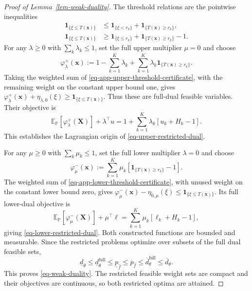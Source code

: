 \begin{proof}[Proof of Lemma~\ref{lem-weak-duality}]
  The threshold relations are the pointwise inequalities
  \begin{align}
    \mathbf1_{\{\xi\le T(\bm x)\}}
    &\le\mathbf1_{\{\xi<r_k\}}+\mathbf1_{\{T(\bm x)\ge r_k\}},
    \label{eq-app-upper-threshold-certificate}\\
    \mathbf1_{\{\xi\le T(\bm x)\}}
    &\ge\mathbf1_{\{\xi\le r_k\}}+\mathbf1_{\{T(\bm x)\ge r_k\}}-1.
    \label{eq-app-lower-threshold-certificate}
  \end{align}
  For any $\lambda\ge0$ with $\sum_k\lambda_k\le1$, set the full upper multiplier $\mu=0$ and choose
  \begin{equation}
    \varphi_\lambda^+(\bm x):=
    1-\sum_{k=1}^K\lambda_k+
    \sum_{k=1}^K\lambda_k\mathbf1_{\{T(\bm x)\ge r_k\}}.
    \label{eq-app-upper-restricted-potential}
  \end{equation}
  Taking the weighted sum of \eqref{eq-app-upper-threshold-certificate}, with the remaining weight on the constant upper bound one, gives
  $\varphi_\lambda^+(\bm x)+\eta_{\lambda,0}(\xi)\ge\mathbf1_{\{\xi\le T(\bm x)\}}$.
  Thus these are full-dual feasible variables. Their objective is
  \[
    \mathbb E_{\mathbb P}\left[\varphi_\lambda^+(\bm X)\right]+\lambda^\top u
    =1+\sum_{k=1}^K\lambda_k\left[u_k+H_k-1\right].
  \]
  This establishes the Lagrangian origin of \eqref{eq-upper-restricted-dual}.

  For any $\mu\ge0$ with $\sum_k\mu_k\le1$, set the full lower multiplier $\lambda=0$ and choose
  \begin{equation}
    \varphi_\mu^-(\bm x):=
    \sum_{k=1}^K\mu_k\left[\mathbf1_{\{T(\bm x)\ge r_k\}}-1\right].
    \label{eq-app-lower-restricted-potential}
  \end{equation}
  The weighted sum of \eqref{eq-app-lower-threshold-certificate}, with unused weight on the constant lower bound zero, gives
  $\varphi_\mu^-(\bm x)-\eta_{0,\mu}(\xi)\le\mathbf1_{\{\xi\le T(\bm x)\}}$.
  Its full lower-dual objective is
  \[
    \mathbb E_{\mathbb P}\left[\varphi_\mu^-(\bm X)\right]+\mu^\top\ell
    =\sum_{k=1}^K\mu_k\left[\ell_k+H_k-1\right],
  \]
  giving \eqref{eq-lower-restricted-dual}. Both constructed functions are bounded and measurable. Since the restricted problems optimize over subsets of the full dual feasible sets,
  \begin{equation}
    \underline d_\theta
    \le\underline d_\theta^{\mathrm{full}}
    \le\underline p_{\hat f}
    \le\overline p_{\hat f}
    \le\overline d_\theta^{\mathrm{full}}
    \le\overline d_\theta.
    \label{eq-app-full-restricted-weak-chain}
  \end{equation}
  This proves \eqref{eq-weak-duality}. The restricted feasible weight sets are compact and their objectives are continuous, so both restricted optima are attained.
\end{proof}

